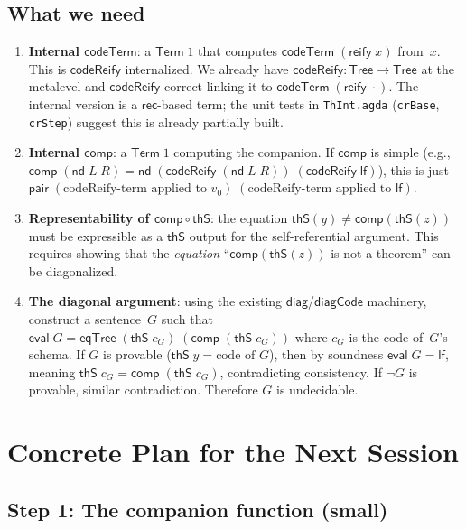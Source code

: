 \documentclass[11pt]{article}
\newcommand{\lf}{\mathsf{lf}}
\newcommand{\nd}{\mathsf{nd}}
\newcommand{\rec}{\mathsf{rec}}
\newcommand{\eval}{\mathsf{eval}}
\newcommand{\reify}{\mathsf{reify}}
\newcommand{\codeTerm}{\mathsf{codeTerm}}
\newcommand{\codeReify}{\mathsf{codeReify}}
\newcommand{\diagCode}{\mathsf{diagCode}}
\newcommand{\diag}{\mathsf{diag}}
\newcommand{\thS}{\mathsf{thS}}
\newcommand{\eqTree}{\mathsf{eqTree}}
\newcommand{\Tree}{\mathsf{Tree}}
\newcommand{\Term}{\mathsf{Term}}
\newcommand{\comp}{\mathsf{comp}}
\begin{document}
\subsection{What we need}

\begin{enumerate}
\item \textbf{Internal $\codeTerm$}: a $\Term\;1$ that computes
  $\codeTerm\;(\reify\;x)$ from~$x$.  This is $\codeReify$ internalized.
  We already have $\codeReify : \Tree \to \Tree$ at the metalevel
  and $\codeReify$-correct linking it to $\codeTerm\;(\reify\;\cdot)$.
  The internal version is a $\rec$-based term; the unit tests in
  \texttt{ThInt.agda} (\texttt{crBase}, \texttt{crStep}) suggest
  this is already partially built.

\item \textbf{Internal $\comp$}: a $\Term\;1$ computing the companion.
  If $\comp$ is simple (e.g., $\comp\;(\nd\;L\;R) =
  \nd\;(\codeReify\;(\nd\;L\;R))\;(\codeReify\;\lf)$), this is
  just $\mathsf{pair}\;(\text{codeReify-term applied to } v_0)\;
  (\text{codeReify-term applied to } \lf)$.

\item \textbf{Representability of $\comp \circ \thS$}: the equation
  $\thS(y) \neq \comp(\thS(z))$ must be expressible as a $\thS$ output
  for the self-referential argument.  This requires showing that
  the \emph{equation} ``$\comp(\thS(z))$ is not a theorem'' can be
  diagonalized.

\item \textbf{The diagonal argument}: using the existing
  $\diag$/$\diagCode$ machinery, construct a sentence~$G$ such that
  $\eval\;G = \eqTree\;(\thS\;c_G)\;(\comp\;(\thS\;c_G))$ where
  $c_G$ is the code of~$G$'s schema.  If $G$ is provable ($\thS\;y =
  \text{code of } G$), then by soundness $\eval\;G = \lf$, meaning
  $\thS\;c_G = \comp\;(\thS\;c_G)$, contradicting consistency.
  If $\neg G$ is provable, similar contradiction.  Therefore $G$ is
  undecidable.
\end{enumerate}


\section{Concrete Plan for the Next Session}\label{sec:plan}

\subsection{Step 1: The companion function (small)}
\end{document}

